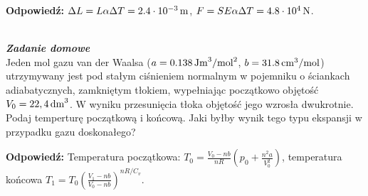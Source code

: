 \documentclass[11pt,a4paper]{article}
\newcounter{zaddom}\newcommand{\zaddom}[1][]{\addtocounter{zaddom}{1} ~\\  {\bf \emph{Zadanie domowe \arabic{zaddom} #1 }} \\}
\begin{document}
\vskip 10pt
\textbf{Odpowiedź:} $\Delta L = L \alpha \Delta T = 2.4 \cdot 10^{-3}\, {\rm m}$, $F = S E \alpha \Delta T = 4.8 \cdot 10^4\, {\rm N}$.

\zaddom
Jeden mol gazu van der Waalsa ($a=0.138\,\rm{Jm}^3/\rm{mol}^2$, $b=31.8\,\rm{cm^3/mol}$)
utrzymywany jest pod stałym ciśnieniem normalnym w pojemniku o ściankach adiabatycznych, zamkniętym tłokiem,
wypełniając początkowo objętość $V_0=22,4\,\rm{dm}^3$.
W wyniku przesunięcia tłoka objętość jego wzrosła dwukrotnie. Podaj temperturę początkową i końcową.  
Jaki byłby wynik tego typu ekspansji w przypadku gazu doskonałego?

\vskip 10pt
\textbf{Odpowiedź:} 
Temperatura początkowa: $T_0 = \frac{V_0-nb}{nR}\left(p_0 + \frac{n^2 a}{V_0^2} \right)$, temperatura końcowa $T_1 = T_0 \left(\frac{V_1 - nb}{V_0 - nb} \right)^{nR/C_v}$. 
\end{document}

